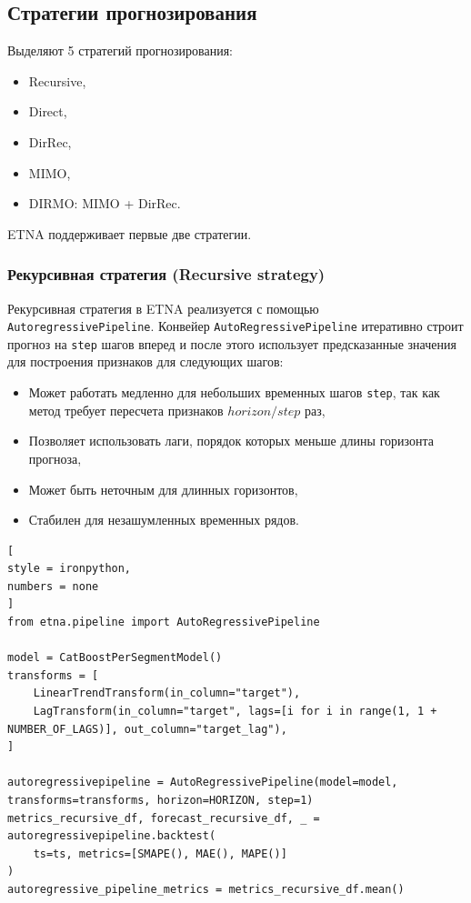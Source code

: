 \documentclass[%
	11pt,
	a4paper,
	utf8,
		]{article}
\begin{document}
\subsection{Стратегии прогнозирования}

Выделяют 5 стратегий прогнозирования:
\begin{itemize}
	\item Recursive,
	
	\item Direct,
	
	\item DirRec,
	
	\item MIMO,
	
	\item DIRMO: MIMO + DirRec.
\end{itemize}

ETNA поддерживает первые две стратегии.

\subsubsection{Рекурсивная стратегия (Recursive strategy)}

Рекурсивная стратегия в ETNA реализуется с помощью \verb|AutoregressivePipeline|. Конвейер \verb|AutoRegressivePipeline| итеративно строит прогноз на \verb|step| шагов вперед и после этого использует предсказанные значения для построения признаков для следующих шагов:
\begin{itemize}
	\item Может работать медленно для небольших временных шагов \verb|step|, так как метод требует пересчета признаков $ horizon / step $ раз,
	
	\item Позволяет использовать лаги, порядок которых меньше длины горизонта прогноза,
	
	\item Может быть неточным для длинных горизонтов,
	
	\item Стабилен для незашумленных временных рядов.
\end{itemize}

\begin{lstlisting}[
style = ironpython,
numbers = none
]
from etna.pipeline import AutoRegressivePipeline

model = CatBoostPerSegmentModel()
transforms = [
	LinearTrendTransform(in_column="target"),
	LagTransform(in_column="target", lags=[i for i in range(1, 1 + NUMBER_OF_LAGS)], out_column="target_lag"),
]

autoregressivepipeline = AutoRegressivePipeline(model=model, transforms=transforms, horizon=HORIZON, step=1)
metrics_recursive_df, forecast_recursive_df, _ = autoregressivepipeline.backtest(
	ts=ts, metrics=[SMAPE(), MAE(), MAPE()]
)
autoregressive_pipeline_metrics = metrics_recursive_df.mean()
\end{lstlisting}
\end{document}
